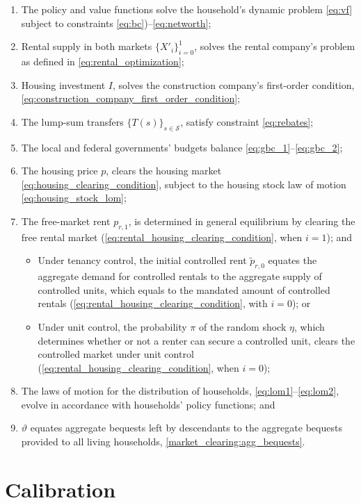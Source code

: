 \documentclass[parskip=full]{article}
\begin{document}
\begin{enumerate}
\item The policy and value functions solve the household's dynamic problem \eqref{eq:vf} subject to constraints \eqref{eq:bc})--\eqref{eq:networth};
\item Rental supply in both markets $\{X'_{i}\}^{1}_{i=0}$, solves the rental company's problem as defined in \eqref{eq:rental_optimization};
\item Housing investment $I$, solves the construction company's first-order condition, \eqref{eq:construction_company_first_order_condition};
\item The lump-sum transfers $\{T(s)\}_{s \in \mathcal{S}}$, satisfy constraint \eqref{eq:rebates};
\item The local and federal governments' budgets balance \eqref{eq:gbc_1}--\eqref{eq:gbc_2};
\item The housing price $p$, clears the housing market
\eqref{eq:housing_clearing_condition}, subject to the housing stock law of motion \eqref{eq:housing_stock_lom};
\item The free-market rent $p_{r,1}$, is determined in general equilibrium by clearing the free rental market (\eqref{eq:rental_housing_clearing_condition}, when $i=1$); and
\begin{itemize}
    \item Under tenancy control, the initial controlled rent $\tilde{p}_{r,0}$ equates the aggregate demand for controlled rentals to the aggregate supply of controlled units, which equals to the mandated amount of controlled rentals (\eqref{eq:rental_housing_clearing_condition}, with $i=0$); or
    \item Under unit control, the probability $\pi$ of the random shock $\eta$, which determines whether or not a renter can secure a controlled unit, clears the controlled market under unit control (\eqref{eq:rental_housing_clearing_condition}, when $i=0$);
\end{itemize}
\item The laws of motion for the distribution of households, \eqref{eq:lom1}--\eqref{eq:lom2}, evolve in accordance with households' policy functions; and
\item $\vartheta$ equates aggregate bequests left by descendants to the aggregate bequests provided to all living households, \eqref{market_clearing:agg_bequests}.
\end{enumerate}

\section{Calibration}\label{sec:calibration}
\end{document}
